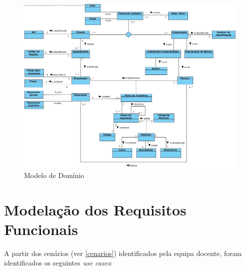 \documentclass[a4paper,12pt]{scrreprt}
\begin{document}
\begin{figure}[!ht]
    \centering
    \includegraphics[scale=0.40]{Modelo.jpg}
    \caption{Modelo de Domínio}
\end{figure}

\chapter{Modelação dos Requisitos Funcionais} \label{modelacao_req_funcionais}

A partir dos cenários (ver \ref{cenarios}) identificados pela equipa docente, 
foram identificados os seguintes \textit{use cases}:
\end{document}

